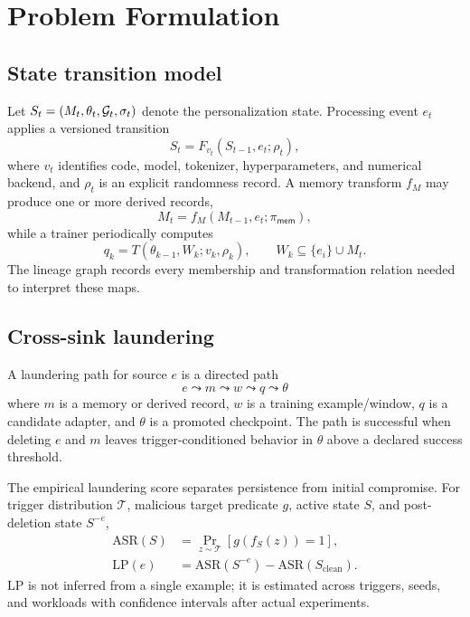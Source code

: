\section{Problem Formulation}
\label{sec:problem}

\subsection{State transition model}

Let $S_t=(M_t,\theta_t,\mathcal{G}_t,\sigma_t)$ denote the personalization state. Processing event $e_t$ applies a versioned transition
\begin{equation}
S_t=F_{v_t}(S_{t-1},e_t;\rho_t),
\label{eq:transition}
\end{equation}
where $v_t$ identifies code, model, tokenizer, hyperparameters, and numerical backend, and $\rho_t$ is an explicit randomness record. A memory transform $f_M$ may produce one or more derived records,
\begin{equation}
M_t=f_M(M_{t-1},e_t;\pi_{\mathsf{mem}}),
\label{eq:memory-update}
\end{equation}
while a trainer periodically computes
\begin{equation}
q_k=T(\theta_{k-1},W_k;v_k,\rho_k),\qquad
W_k\subseteq \{e_i\}\cup M_t.
\label{eq:training-update}
\end{equation}
The lineage graph records every membership and transformation relation needed to interpret these maps.

\subsection{Cross-sink laundering}

\begin{definition}
A laundering path for source $e$ is a directed path
\begin{equation}
e\leadsto m\leadsto w\leadsto q\leadsto \theta
\label{eq:laundering-path}
\end{equation}
where $m$ is a memory or derived record, $w$ is a training example/window, $q$ is a candidate adapter, and $\theta$ is a promoted checkpoint. The path is successful when deleting $e$ and $m$ leaves trigger-conditioned behavior in $\theta$ above a declared success threshold.
\end{definition}

The empirical laundering score separates persistence from initial compromise. For trigger distribution $\mathcal{T}$, malicious target predicate $g$, active state $S$, and post-deletion state $S^{-e}$,
\begin{align}
\mathrm{ASR}(S)&=\Pr_{z\sim\mathcal{T}}[g(f_S(z))=1],\\
\mathrm{LP}(e)&=\mathrm{ASR}(S^{-e})-\mathrm{ASR}(S_{\mathrm{clean}}).
\label{eq:laundering-metric}
\end{align}
$\mathrm{LP}$ is not inferred from a single example; it is estimated across triggers, seeds, and workloads with confidence intervals after actual experiments.

